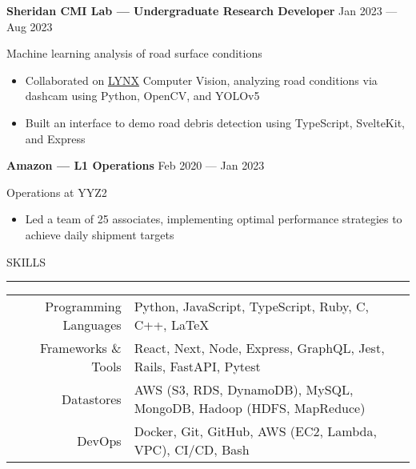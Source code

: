 \documentclass[9pt]{extarticle}
\begin{document}
\begin{adjustwidth}{10pt}{10pt}
	\vspace{-5pt}

	\textcolor{imptextblack}{\textbf{\large Sheridan CMI Lab — Undergraduate Research Developer}} \hfill Jan 2023 — Aug 2023
	
	Machine learning analysis of road surface conditions
	
	\begin{itemize}[topsep=0pt, labelsep=10pt, leftmargin=24pt, label=\textcolor{imptextblack}{\textbullet}]
		\item Collaborated on \href{https://github.com/Lynx-Data-Processing}{LYNX} Computer Vision, analyzing road conditions via dashcam using Python, OpenCV, and YOLOv5
		\item Built an interface to demo road debris detection using TypeScript, SvelteKit, and Express
	\end{itemize}
	
	\vspace{5pt}
	\textcolor{imptextblack}{\textbf{\large Amazon — L1 Operations}} \hfill Feb 2020 — Jan 2023
	
	Operations at YYZ2
	
	\begin{itemize}[topsep=0pt, labelsep=10pt, leftmargin=24pt, label=\textcolor{imptextblack}{\textbullet}]
		\item Led a team of \textcolor{imptextblack}{25} associates, implementing optimal performance strategies to achieve daily shipment targets
	\end{itemize}
\end{adjustwidth}


\vspace{5pt}

\begin{adjustwidth}{4pt}{4pt} \large {\selectfont SKILLS} \end{adjustwidth}
\rule[8pt]{\linewidth}{0.4pt}

\begin{adjustwidth}{10pt}{10pt}
	\vspace{-4pt}

	\begin{adjustwidth}{18pt}{18pt}
		\begin{tabular}{ r l }
		 	\textcolor{imptextblack}{Programming Languages} & Python, JavaScript, TypeScript, Ruby, C, C++, \textrm{\LaTeX} \\ 
		 	\textcolor{imptextblack}{Frameworks \& Tools} & React, Next, Node, Express, GraphQL, Jest, Rails, FastAPI, Pytest \\  
		 	\textcolor{imptextblack}{Datastores} & AWS ({\small S3, RDS, DynamoDB}), MySQL, MongoDB, Hadoop ({\small HDFS, MapReduce}) \\  
		 	\textcolor{imptextblack}{DevOps} & Docker, Git, GitHub, AWS ({\small EC2, Lambda, VPC}), CI/CD, Bash \\  
		\end{tabular}
	\end{adjustwidth}
\end{adjustwidth}
\end{document}
